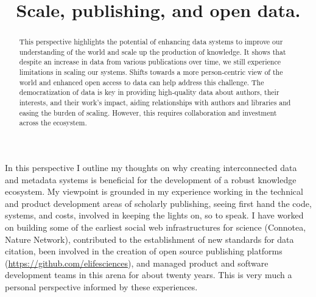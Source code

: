 \documentclass[]{hdsr}
\begin{document}




\begin{center}

  \title{Scale, publishing, and open data.}
  \maketitle

  \thispagestyle{empty}
  
  \vspace*{.2in}



\begin{abstract}
This perspective highlights the potential of enhancing data systems to improve our understanding of the world and scale up the production of knowledge. It shows that despite an increase in data from various publications over time, we still experience limitations in scaling our systems. Shifts towards a more person-centric view of the world and enhanced open access to data can help address this challenge. The democratization of data is key in providing high-quality data about authors, their interests, and their work's impact, aiding relationships with authors and libraries and easing the burden of scaling. However, this requires collaboration and investment across the ecosystem.    
\end{abstract}
\end{center}

  
\copyrightnotice



\label{sec1}
In this perspective I outline my thoughts on why creating interconnected data and metadata systems is beneficial for the development of a robust knowledge ecosystem. My viewpoint is grounded in my experience working in the technical and product development areas of scholarly publishing, seeing first hand the code, systems, and costs, involved in keeping the lights on, so to speak. I have worked on building some of the earliest social web infrastructures for science (Connotea, Nature Network), contributed to the establishment of new standards for data citation, been involved in the creation of open source publishing platforms (\href{https://github.com/elifesciences}{https://github.com/elifesciences}), and managed product and software development teams in this arena for about twenty years. This is very much a personal perspective informed by these experiences.
\end{document}
